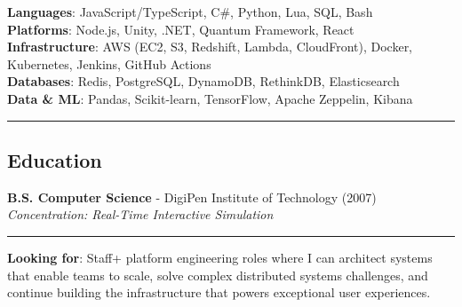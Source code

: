 \documentclass[
]{article}
\begin{document}
\textbf{Languages}: JavaScript/TypeScript, C\#, Python, Lua, SQL, Bash\\
\textbf{Platforms}: Node.js, Unity, .NET, Quantum Framework, React\\
\textbf{Infrastructure}: AWS (EC2, S3, Redshift, Lambda, CloudFront),
Docker, Kubernetes, Jenkins, GitHub Actions\\
\textbf{Databases}: Redis, PostgreSQL, DynamoDB, RethinkDB,
Elasticsearch\\
\textbf{Data \& ML}: Pandas, Scikit-learn, TensorFlow, Apache Zeppelin,
Kibana

\begin{center}\rule{0.5\linewidth}{0.5pt}\end{center}

\subsection{Education}\label{education}

\textbf{B.S. Computer Science} - DigiPen Institute of Technology
(2007)\\
\emph{Concentration: Real-Time Interactive Simulation}

\begin{center}\rule{0.5\linewidth}{0.5pt}\end{center}

\textbf{Looking for}: Staff+ platform engineering roles where I can
architect systems that enable teams to scale, solve complex distributed
systems challenges, and continue building the infrastructure that powers
exceptional user experiences.
\end{document}
